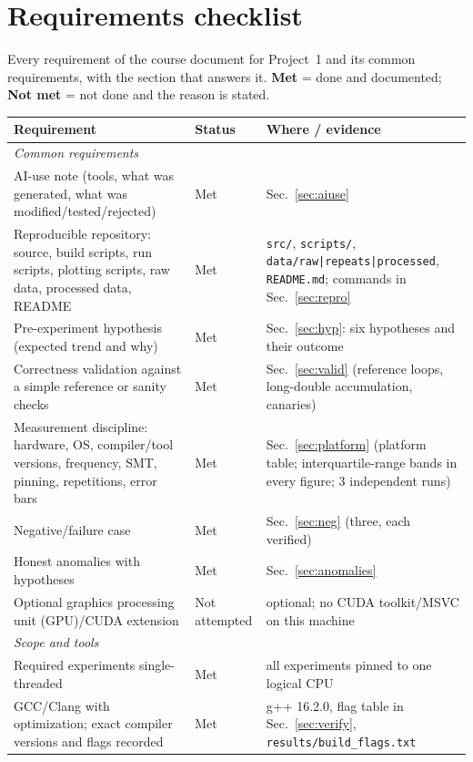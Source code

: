 \documentclass{article}
\begin{document}
\section{Requirements checklist}\label{sec:checklist}
Every requirement of the course document \cite{course} for Project~1 and its common requirements, with the section that answers it. \textbf{Met} = done and documented; \textbf{Not met} = not done and the reason is stated.
\begin{center}\footnotesize
\begin{longtable}{p{6.3cm}p{1.5cm}p{7.7cm}}
\toprule
\textbf{Requirement} & \textbf{Status} & \textbf{Where / evidence} \\
\midrule
\endhead
\multicolumn{3}{l}{\textit{Common requirements}} \\
AI-use note (tools, what was generated, what was modified/tested/rejected) & Met & Sec.~\ref{sec:aiuse} \\
Reproducible repository: source, build scripts, run scripts, plotting scripts, raw data, processed data, README & Met & \texttt{src/}, \texttt{scripts/}, \texttt{data/raw|repeats|processed}, \texttt{README.md}; commands in Sec.~\ref{sec:repro} \\
Pre-experiment hypothesis (expected trend and why) & Met & Sec.~\ref{sec:hyp}: six hypotheses and their outcome \\
Correctness validation against a simple reference or sanity checks & Met & Sec.~\ref{sec:valid} (reference loops, long-double accumulation, canaries) \\
Measurement discipline: hardware, OS, compiler/tool versions, frequency, SMT, pinning, repetitions, error bars & Met & Sec.~\ref{sec:platform} (platform table; interquartile-range bands in every figure; 3 independent runs) \\
Negative/failure case & Met & Sec.~\ref{sec:neg} (three, each verified) \\
Honest anomalies with hypotheses & Met & Sec.~\ref{sec:anomalies} \\
Optional graphics processing unit (GPU)/CUDA extension & Not attempted & optional; no CUDA toolkit/MSVC on this machine \\
\midrule
\multicolumn{3}{l}{\textit{Scope and tools}} \\
Required experiments single-threaded & Met & all experiments pinned to one logical CPU \\
GCC/Clang with optimization; exact compiler versions and flags recorded & Met & g++ 16.2.0, flag table in Sec.~\ref{sec:verify}, \texttt{results/build\_flags.txt} \\

\end{longtable}
\end{center}
\end{document}
